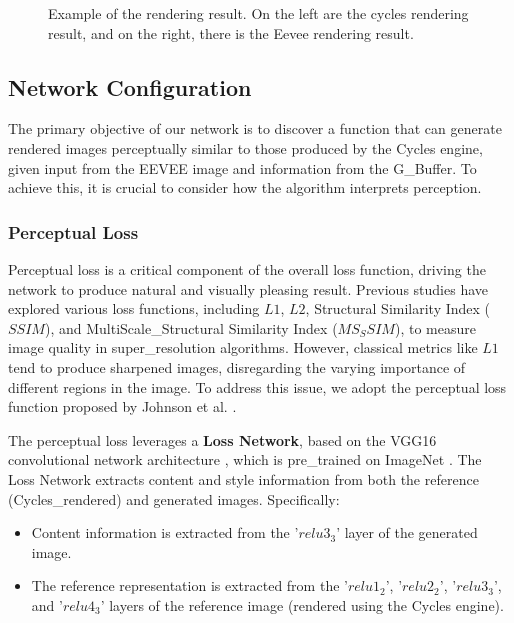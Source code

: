 \begin{figure}
\begin{subfigure}{0.24\linewidth}
         \caption{}
         \label{fig:rendering_dataset_grandi_eevee}
    \end{subfigure}
    \caption[Rendering result based on the bitmap engine EEVEE]{Example of the rendering result. On the left are the cycles rendering result, and on the right, there is the Eevee rendering result.}
    \label{fig:render_dataset_comparison}
\end{figure}

\subsection{Network Configuration}
The primary objective of our network is to discover a function that can generate rendered images perceptually similar to those produced by the Cycles engine, given input from the EEVEE image and information from the G_Buffer. To achieve this, it is crucial to consider how the algorithm interprets perception.

\subsubsection{Perceptual Loss}
Perceptual loss is a critical component of the overall loss function, driving the network to produce natural and visually pleasing result. Previous studies \cite{zhao2017loss, ding2021comparison} have explored various loss functions, including $L1$, $L2$, Structural Similarity Index ($SSIM$), and MultiScale_Structural Similarity Index ($MS_SSIM$), to measure image quality in super_resolution algorithms. However, classical metrics like $L1$ tend to produce sharpened images, disregarding the varying importance of different regions in the image. To address this issue, we adopt the perceptual loss function proposed by Johnson et al. \cite{johnson2016perceptual}.

The perceptual loss leverages a \textbf{Loss Network}, based on the VGG16 convolutional network architecture \cite{simonyan2014very}, which is pre_trained on ImageNet \cite{imagenet2009dataset}. The Loss Network extracts content and style information from both the reference (Cycles_rendered) and generated images. Specifically:
\begin{itemize}
\item Content information is extracted from the '\textit{$relu3_3$}' layer of the generated image.
\item The reference representation is extracted from the '\textit{$relu1_2$}', '\textit{$relu2_2$}', '\textit{$relu3_3$}', and '\textit{$relu4_3$}' layers of the reference image (rendered using the Cycles engine).
\end{itemize}

